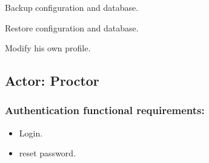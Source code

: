 \documentclass[a4paper,12p]{article}
\begin{document}
     \item Backup configuration and database.
     \item Restore configuration and database.
     \item Modify his own profile.

     \subsection{Actor: Proctor}
     \subsubsection{Authentication functional requirements:}
     \begin{itemize}
         \item Login.
         \item reset password.
     \end{itemize}
\end{document}
